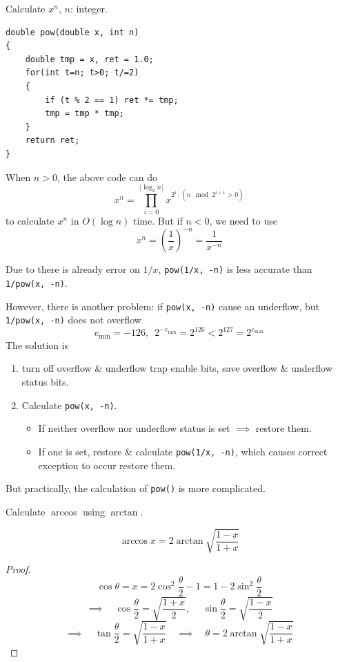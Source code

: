 \begin{eg}
    Calculate $x^n$, $n$: integer.
\end{eg}

\begin{verbatim}
double pow(double x, int n)
{
    double tmp = x, ret = 1.0;
    for(int t=n; t>0; t/=2)
    {
        if (t % 2 == 1) ret *= tmp;
        tmp = tmp * tmp;
    }
    return ret;
}
\end{verbatim}

When $n > 0$, the above code can do 
\[
    x^n = \prod_{i=0}^{\lfloor \log_2 n \rfloor} x^{2^i \cdot (n \mod 2^{i+1} > 0)}
\]
to calculate $x^n$ in $O(\log n)$ time. But if $n < 0$, we need to use \[
    x^n = \left(\frac{1}{x}\right)^{-n} = \frac{1}{x^{-n}}
\]

Due to there is already error on $1/x$, \texttt{pow(1/x, -n)} is less accurate than \texttt{1/pow(x, -n)}.

However, there is another problem: if \texttt{pow(x, -n)} cause an underflow, but \texttt{1/pow(x, -n)} does not overflow \[
    e_{\min} = -126,\; \ 2^{-e_{\min}} = 2^{126} < 2^{127} = 2^{e_{\max}}
\]
The solution is 
\begin{enumerate}[label=$\arabic*^\circ$]
    \item turn off overflow \& underflow trap enable bits, save overflow \& underflow status bits.
    \item Calculate \texttt{pow(x, -n)}.
    \begin{itemize}
        \item If neither overflow nor underflow status is set $\implies$ restore them.
        \item If one is set, restore \& calculate \texttt{pow(1/x, -n)}, which causes correct exception to occur restore them.
    \end{itemize}
\end{enumerate}

But practically, the calculation of \texttt{pow()} is more complicated.

\begin{eg}
    Calculate $\arccos$ using $\arctan$.
\end{eg}

\begin{theorem}
    \[
        \arccos x = 2 \arctan \sqrt{\frac{1-x}{1+x}}
    \]
\end{theorem}
\begin{proof}
    \[
        \cos \theta = x = 2 \cos^2 \frac{\theta}{2} - 1 = 1 - 2 \sin^2 \frac{\theta}{2}
    \]
    \[
        \implies \quad \cos \frac{\theta}{2} = \sqrt{\frac{1+x}{2}},\;\quad \sin \frac{\theta}{2} = \sqrt{\frac{1-x}{2}}
    \]
    \[
        \implies \quad \tan \frac{\theta}{2} = \sqrt{\frac{1-x}{1+x}} \quad \implies \quad \theta = 2 \arctan \sqrt{\frac{1-x}{1+x}}
    \]
\end{proof}

